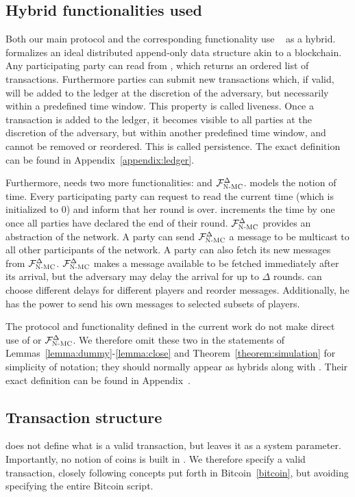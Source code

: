   \subsection{Hybrid functionalities used}
    Both our main protocol and the corresponding functionality use
    \ledger~\cite{BMTZ17,genesis} as a hybrid. \ledger{} formalizes an ideal
    distributed append-only data structure akin to a blockchain. Any
    participating party can read from \ledger, which returns an ordered list
    of transactions. Furthermore parties can submit new transactions which, if
    valid, will be added to the ledger at the discretion of the adversary, but
    necessarily within a predefined time window. This property is called
    liveness. Once a transaction is added to the ledger, it becomes visible to
    all parties at the discretion of the adversary, but within another
    predefined time window, and cannot be removed or reordered. This is called
    persistence. The exact definition can be found in
    Appendix~\ref{appendix:ledger}.

    Furthermore, \ledger{} needs two more functionalities: \Fclock and
    $\mathcal{F}_{\textsc{N-MC}}^\Delta$. \Fclock models the notion of time. Every participating
    party can request to read the current time (which is initialized to 0) and
    inform \Fclock that her round is over. \Fclock increments the time by one
    once all parties have declared the end of their round. $\mathcal{F}_{\textsc{N-MC}}^\Delta$
    provides an abstraction of the network. A party can send
    $\mathcal{F}_{\textsc{N-MC}}^\Delta$ a message to be multicast to all other participants of
    the network. A party can also fetch its new messages from
    $\mathcal{F}_{\textsc{N-MC}}^\Delta$. $\mathcal{F}_{\textsc{N-MC}}^\Delta$ makes a message available to be
    fetched immediately after its arrival, but the adversary may delay the
    arrival for up to $\Delta$ rounds. \adversary{} can choose different delays
    for different players and reorder messages. Additionally, he has the power
    to send his own messages to selected subsets of players.

    The protocol and functionality defined in the current work do not make
    direct use of \Fclock or $\mathcal{F}_{\textsc{N-MC}}^\Delta$. We therefore omit these two
    in the statements of Lemmas~\ref{lemma:dummy}-\ref{lemma:close} and
    Theorem~\ref{theorem:simulation} for simplicity of notation; they should
    normally appear as hybrids along with \ledger. Their exact definition can be
    found in Appendix~.

  \subsection{Transaction structure}
    \ledger{} does not define what is a valid transaction, but leaves it as a
    system parameter. Importantly, no notion of coins is built in \ledger. We
    therefore specify a valid transaction, closely following concepts put forth
    in Bitcoin~\ref{bitcoin}, but avoiding specifying the entire Bitcoin script.

